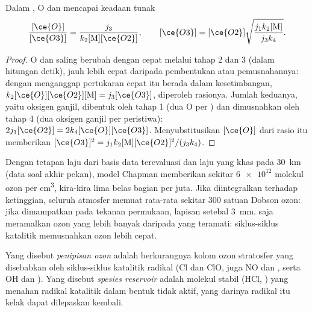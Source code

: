 \begin{theorem}\label{thm:b3:photochemistry:chapman}
Dalam , O dan  mencapai keadaan tunak
\[
  \frac{[\ce{O}]}{[\ce{O3}]} = \frac{j_3}{k_2[\mathrm M][\ce{O2}]}, \qquad
  [\ce{O3}] = [\ce{O2}]\sqrt{\frac{j_1k_2[\mathrm M]}{j_3k_4}} .
\]
\end{theorem}

\begin{proof}
O dan  saling berubah dengan cepat melalui tahap 2 dan 3 (dalam
hitungan detik), jauh lebih cepat daripada pembentukan atau pemusnahannya:
dengan menganggap pertukaran cepat itu berada dalam kesetimbangan,
$k_2[\ce{O}][\ce{O2}][\mathrm M] = j_3[\ce{O3}]$, diperoleh rasionya. Jumlah keduanya,
yaitu oksigen ganjil, dibentuk oleh tahap 1 (dua O per ) dan dimusnahkan
oleh tahap 4 (dua oksigen ganjil per peristiwa):
$2j_1[\ce{O2}] = 2k_4[\ce{O}][\ce{O3}]$. Menyubstitusikan $[\ce{O}]$ dari rasio itu memberikan $[\ce{O3}]^2 = j_1k_2[\mathrm M][\ce{O2}]^2/(j_3k_4)$.
\end{proof}

Dengan tetapan laju dari basis data terevaluasi dan laju  yang khas
pada \qty{30}{km} (data soal akhir pekan), model Chapman memberikan sekitar
$\num{6e12}$ molekul ozon per \unit{cm^3}, kira-kira lima belas bagian per juta.
Jika diintegralkan terhadap ketinggian, seluruh atmosfer memuat rata-rata
sekitar 300 satuan Dobson ozon: jika dimampatkan pada tekanan permukaan, lapisan
setebal \qty{3}{mm}.  saja meramalkan ozon yang lebih banyak
daripada yang teramati: siklus-siklus katalitik memusnahkan ozon lebih cepat.

\begin{definition}\label{def:b3:photochemistry:ozone-depletion}
Yang disebut \emph{penipisan ozon} adalah berkurangnya
kolom ozon stratosfer yang disebabkan oleh siklus-siklus katalitik radikal (Cl
dan ClO, juga NO dan , serta OH dan ). Yang disebut \emph{spesies
reservoir} adalah molekul stabil (HCl, ) yang
menahan radikal katalitik dalam bentuk tidak aktif, yang darinya radikal itu
kelak dapat dilepaskan kembali.
\end{definition}

